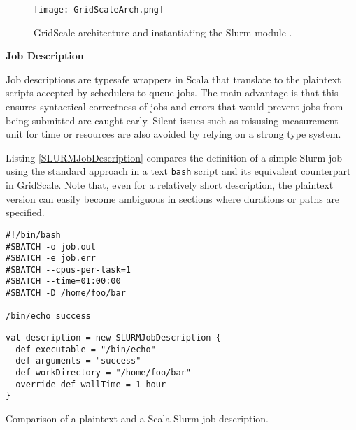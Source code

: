 \begin{figure}[h]
	\centering
		\texttt{[image: GridScaleArch.png]}
	\caption{GridScale architecture and instantiating the Slurm module \cite{Reuillon2016}.}
	\label{GridScaleArch}
\end{figure}

\vspace{4mm}
\textbf{Job Description}
\vspace{1mm}

Job descriptions are typesafe wrappers in Scala that translate to the plaintext scripts accepted by schedulers to queue jobs. The main advantage is that this ensures syntactical correctness of jobs and errors that would prevent jobs from being submitted are caught early. Silent issues such as misusing measurement unit for time or resources are also avoided by relying on a strong type system. 

Listing \ref{SLURMJobDescription} compares the definition of a simple Slurm job using the standard approach in a text \verb|bash| script and its equivalent counterpart in GridScale. Note that, even for a relatively short description, the plaintext version can easily become ambiguous in sections where durations or paths are specified.

\begin{listing}[h]
	\centering
	\begin{minipage}[b]{5.03cm}
		\begin{verbatim}
#!/bin/bash
#SBATCH -o job.out
#SBATCH -e job.err
#SBATCH --cpus-per-task=1 
#SBATCH --time=01:00:00
#SBATCH -D /home/foo/bar

/bin/echo success
        \end{verbatim}
	\end{minipage}
	\hspace{0.5cm}
    \begin{minipage}[b]{8.29cm}
		\begin{verbatim}
val description = new SLURMJobDescription { 
  def executable = "/bin/echo"
  def arguments = "success"
  def workDirectory = "/home/foo/bar"
  override def wallTime = 1 hour
}
		\end{verbatim}
	\end{minipage}
	\caption{Comparison of a plaintext and a Scala Slurm job description.}
	\label{SLURMJobDescription}
\end{listing}

